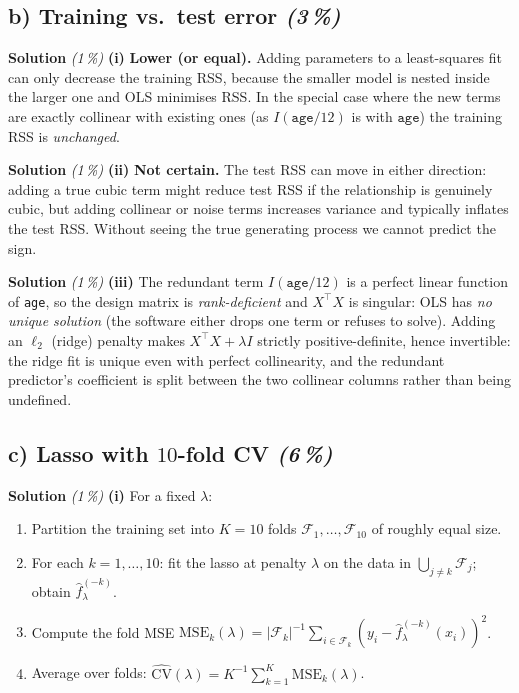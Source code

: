 \documentclass[11pt,a4paper]{article}
\newcommand{\subpoints}[1]{\textit{(#1\,\%)}}
\newcommand{\sol}{\noindent\textbf{Solution}}
\begin{document}
\subsection*{b) Training vs.\ test error \subpoints{3}}

\sol{} \subpoints{1} \textbf{(i)} \textbf{Lower (or equal).} Adding parameters to a least-squares
fit can only decrease the training RSS, because the smaller model is nested inside the larger one
and OLS minimises RSS. In the special case where the new terms are exactly collinear with existing
ones (as $I(\texttt{age}/12)$ is with $\texttt{age}$) the training RSS is \emph{unchanged}.

\medskip
\sol{} \subpoints{1} \textbf{(ii)} \textbf{Not certain.} The test RSS can move in either direction:
adding a true cubic term might reduce test RSS if the relationship is genuinely cubic, but adding
collinear or noise terms increases variance and typically inflates the test RSS. Without seeing the
true generating process we cannot predict the sign.

\medskip
\sol{} \subpoints{1} \textbf{(iii)} The redundant term $I(\texttt{age}/12)$ is a perfect linear
function of \texttt{age}, so the design matrix is \emph{rank-deficient} and $X^\top X$ is singular:
OLS has \emph{no unique solution} (the software either drops one term or refuses to solve).
Adding an $\ell_2$ (ridge) penalty makes $X^\top X + \lambda I$ strictly positive-definite, hence
invertible: the ridge fit is unique even with perfect collinearity, and the redundant predictor's
coefficient is split between the two collinear columns rather than being undefined.

\subsection*{c) Lasso with $10$-fold CV \subpoints{6}}

\sol{} \subpoints{1} \textbf{(i)} For a fixed $\lambda$:
\begin{enumerate}
  \item Partition the training set into $K=10$ folds $\mathcal{F}_1,\ldots,\mathcal{F}_{10}$ of roughly equal size.
  \item For each $k=1,\ldots,10$: fit the lasso at penalty $\lambda$ on the data in
        $\bigcup_{j\neq k}\mathcal{F}_j$; obtain $\hat f^{(-k)}_\lambda$.
  \item Compute the fold MSE $\mathrm{MSE}_k(\lambda) = |\mathcal{F}_k|^{-1}\sum_{i\in\mathcal{F}_k}(y_i - \hat f^{(-k)}_\lambda(x_i))^2$.
  \item Average over folds: $\widehat{\mathrm{CV}}(\lambda) = K^{-1}\sum_{k=1}^K \mathrm{MSE}_k(\lambda)$.
\end{enumerate}
\end{document}
